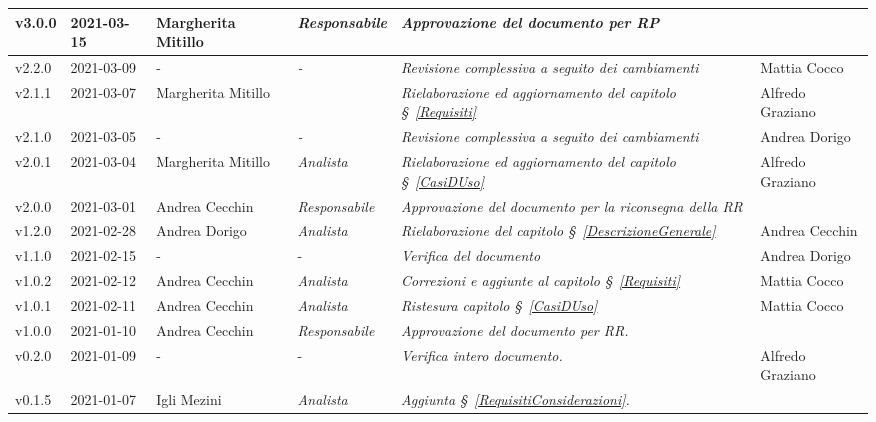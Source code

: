 {\begin{center}
\begin{longtable}[c]{|p{2cm-1\tabcolsep}|p{2cm}|p{3cm-2\tabcolsep}|p{}|p{}|p{3cm}|}
		\hline
		\centering v3.0.0 & 2021-03-15 & Margherita Mitillo & \centering \textit{Responsabile} & \textit{Approvazione del documento per RP} & \makecell[c]{-}\\
		\hline
		\centering v2.2.0 & 2021-03-09 &\centering - & \centering \textit{-} &\textit{Revisione complessiva a seguito dei cambiamenti} & Mattia Cocco\\
		\hline
		\centering v2.1.1 & 2021-03-07 & Margherita Mitillo & \centering{ \textit{Analista} }&\textit{Rielaborazione ed aggiornamento del capitolo \S~\ref{Requisiti}} &  Alfredo Graziano  \\
		\hline
		\centering v2.1.0 & 2021-03-05 &\centering - & \centering \textit{-} &  \textit{Revisione complessiva a seguito dei cambiamenti}  & Andrea Dorigo\\
		\hline
		\centering v2.0.1 & 2021-03-04 & Margherita Mitillo & \centering \textit{Analista} &\textit{Rielaborazione ed aggiornamento del capitolo \S~\ref{CasiDUso}} & Alfredo Graziano  \\
		\hline
		\centering v2.0.0 & 2021-03-01 & Andrea Cecchin & \centering \textit{Responsabile} &\textit{Approvazione del documento per la riconsegna della RR} &  \makecell[c]{-}\\
		\hline
		\centering v1.2.0 & 2021-02-28 & Andrea Dorigo & \centering \textit{Analista} &\textit{Rielaborazione del capitolo \S~\ref{DescrizioneGenerale}} & Andrea Cecchin  \\
		\hline
		\centering v1.1.0 & 2021-02-15 & \centering - & \centering - &\textit{Verifica del documento} & Andrea Dorigo  \\
		\hline
		\centering v1.0.2 & 2021-02-12 & Andrea Cecchin & \centering \textit{Analista} &\textit{Correzioni e aggiunte al capitolo \S~\ref{Requisiti}} & Mattia Cocco  \\
		\hline
		\centering v1.0.1 & 2021-02-11 & Andrea Cecchin & \centering \textit{Analista} &\textit{Ristesura capitolo \S~\ref{CasiDUso}} & Mattia Cocco  \\
		\hline
		\centering v1.0.0 & 2021-01-10 & Andrea Cecchin & \centering \textit{Responsabile} &\textit{Approvazione del documento per RR.} &  \makecell[c]{-}  \\
		\hline
		\centering v0.2.0 & 2021-01-09 & \centering - & \centering - &\textit{Verifica intero documento.} & Alfredo Graziano  \\
		\hline
		\centering v0.1.5 & 2021-01-07 & Igli Mezini & \centering \textit{Analista} & \textit{Aggiunta  \S~\ref{RequisitiConsiderazioni}.} & \makecell[c]{-}  \\

\end{longtable}
\end{center}}
